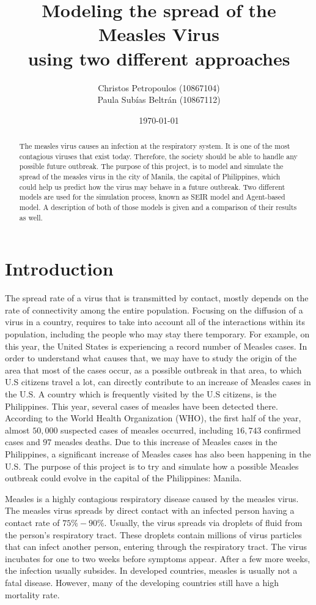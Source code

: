 \documentclass[a4paper]{article}
\title{\bfseries{Modeling the spread of the Measles Virus\\ using two different approaches}}
\author{Christos Petropoulos (10867104) \\ Paula Subías Beltrán (10867112)}
\affil{University of Amsterdam \\ Introduction to Computational Science}
\date{\today}
\begin{document}
\maketitle

\begin{abstract}
The measles virus causes an infection at the respiratory system. It is one of the most contagious viruses that exist today. Therefore, the society should be able to handle any possible future outbreak. The purpose of this project, is to model and simulate the spread of the measles virus in the city of Manila, the capital of Philippines, which could help us predict how the virus may behave in a future outbreak. Two different models are used for the simulation process, known as SEIR model and Agent-based model. A description of both of those models is given and a comparison of their results as well.
\end{abstract}

\section{Introduction}
The spread rate of a virus that is transmitted by contact, mostly depends on the rate of connectivity among the entire population. Focusing on the diffusion of a virus in a country, requires to take into account all of the interactions within its population, including the people who may stay there temporary. For example, on this year, the United States is experiencing a record number of Measles cases. In order to understand what causes that, we may have to study the origin of the area that most of the cases occur, as a possible outbreak in that area, to which U.S citizens travel a lot, can directly contribute to an increase of Measles cases in the U.S. A country which is frequently visited by the U.S citizens, is the Philippines. This year, several cases of measles have been detected there. According to the World Health Organization (WHO), the first half of the year, almost $50,000$ suspected cases of measles occurred, including $16,743$ confirmed cases and $97$ measles deaths. Due to this increase of Measles cases in the Philippines, a significant increase of Measles cases has also been happening in the U.S. The purpose of this project is to try and simulate how a possible Measles outbreak could evolve in the capital of the Philippines: Manila.

Measles is a highly contagious respiratory disease caused by the measles virus. The measles virus spreads by direct contact with an infected person having a contact rate of $75\%-90\%$. Usually, the virus spreads via droplets of fluid from the person's respiratory tract. These droplets contain millions of virus particles that can infect another person, entering through the respiratory tract. The virus incubates for one to two weeks before symptoms appear. After a few more weeks, the infection usually subsides. In developed countries, measles is usually not a fatal disease. However, many of the developing countries still have a high mortality rate.
\end{document}
